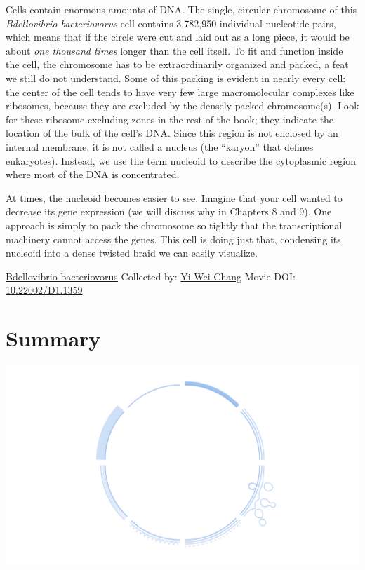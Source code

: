 \documentclass[]{tufte-book}
\begin{document}
Cells contain enormous amounts of DNA. The single, circular chromosome of this \emph{Bdellovibrio bacteriovorus} cell contains 3,782,950 individual nucleotide pairs, which means that if the circle were cut and laid out as a long piece, it would be about \emph{one thousand times} longer than the cell itself. To fit and function inside the cell, the chromosome has to be extraordinarily organized and packed, a feat we still do not understand. Some of this packing is evident in nearly every cell: the center of the cell tends to have very few large macromolecular complexes like ribosomes, because they are excluded by the densely-packed chromosome(s). Look for these ribosome-excluding zones in the rest of the book; they indicate the location of the bulk of the cell's DNA. Since this region is not enclosed by an internal membrane, it is not called a nucleus (the ``karyon'' that defines eukaryotes). Instead, we use the term nucleoid to describe the cytoplasmic region where most of the DNA is concentrated.

At times, the nucleoid becomes easier to see. Imagine that your cell wanted to decrease its gene expression (we will discuss why in Chapters 8 and 9). One approach is simply to pack the chromosome so tightly that the transcriptional machinery cannot access the genes. This cell is doing just that, condensing its nucleoid into a dense twisted braid we can easily visualize.



\hypertarget{htmlwidget-77f8921840c03d2f5c10}{}

\label{fig:2-10}\protect\hyperlink{tree}{Bdellovibrio bacteriovorus} Collected by: \protect\hyperlink{yi-wei_chang}{Yi-Wei Chang} Movie DOI: \href{https://doi.org/10.22002/D1.1359}{10.22002/D1.1359}

\hypertarget{summary}{%
\section{Summary}\label{summary}}

\includegraphics{img/summaries/02_Envelope}
\end{document}
